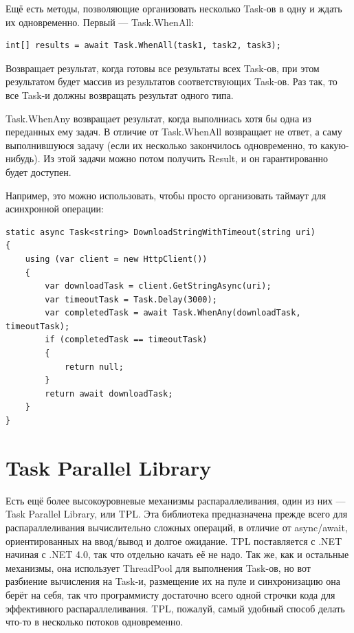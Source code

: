 \documentclass[a5paper]{article}
\begin{document}
Ещё есть методы, позволяющие организовать несколько Task-ов в одну и ждать их одновременно. Первый --- Task.WhenAll:

\begin{verbatim}
int[] results = await Task.WhenAll(task1, task2, task3);
\end{verbatim}

Возвращает результат, когда готовы все результаты всех Task-ов, при этом результатом будет массив из результатов соответствующих Task-ов. Раз так, то все Task-и должны возвращать результат одного типа.

Task.WhenAny возвращает результат, когда выполниась хотя бы одна из переданных ему задач. В отличие от Task.WhenAll возвращает не ответ, а саму выполнившуюся задачу (если их несколько закончилось одновременно, то какую-нибудь). Из этой задачи можно потом получить Result, и он гарантированно будет доступен.

Например, это можно использовать, чтобы просто организовать таймаут для асинхронной операции:

\begin{verbatim}
static async Task<string> DownloadStringWithTimeout(string uri)
{
    using (var client = new HttpClient())
    {
        var downloadTask = client.GetStringAsync(uri);
        var timeoutTask = Task.Delay(3000);
        var completedTask = await Task.WhenAny(downloadTask, timeoutTask);
        if (completedTask == timeoutTask)
        {
            return null;
        }
        return await downloadTask;
    }
}
\end{verbatim}

\section{Task Parallel Library}

Есть ещё более высокоуровневые механизмы распараллеливания, один из них --- Task Parallel Library, или TPL. Эта библиотека предназначена прежде всего для распараллеливания вычислительно сложных операций, в отличие от async/await, ориентированных на ввод/вывод и долгое ожидание. TPL поставляется с .NET начиная с .NET 4.0, так что отдельно качать её не надо. Так же, как и остальные механизмы, она использует ThreadPool для выполнения Task-ов, но вот разбиение вычисления на Task-и, размещение их на пуле и синхронизацию она берёт на себя, так что программисту достаточно всего одной строчки кода для эффективного распараллеливания. TPL, пожалуй, самый удобный способ делать что-то в несколько потоков одновременно.
\end{document}

